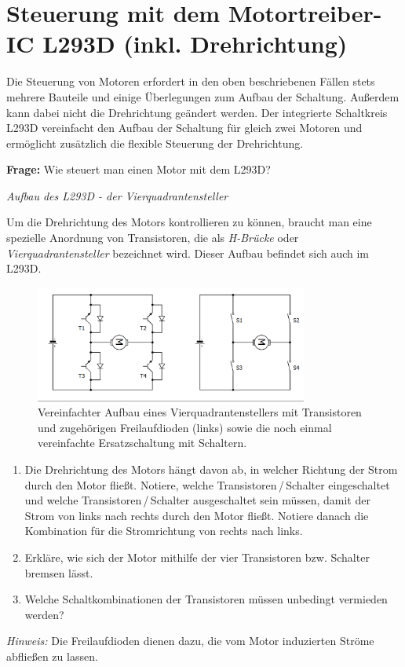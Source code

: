 \newpage
\section{Steuerung mit dem Motortreiber-IC L293D (inkl. Drehrichtung)}

Die Steuerung von Motoren erfordert in den oben beschriebenen Fällen stets mehrere Bauteile und einige Überlegungen zum Aufbau der Schaltung. Außerdem kann dabei nicht die Drehrichtung geändert werden. Der integrierte Schaltkreis L293D vereinfacht den Aufbau der Schaltung für gleich zwei Motoren und ermöglicht zusätzlich die flexible Steuerung der Drehrichtung.

\begin{ziel}
	\textbf{Frage:} Wie steuert man einen Motor mit dem L293D? 
\end{ziel}

\begin{aufgabe} \emph{Aufbau des L293D - der Vierquadrantensteller}
	
	Um die Drehrichtung des Motors kontrollieren zu können, braucht man eine spezielle Anordnung von Transistoren, die als \emph{H-Brücke} oder \emph{Vierquadrantensteller} bezeichnet wird. Dieser Aufbau befindet sich auch im L293D.
	
	\begin{figure}[H]
		\centering
		\includegraphics[width=0.8\textwidth]{./Zeichnungen/vierquadrantensteller.png}
		\caption{Vereinfachter Aufbau eines Vierquadrantenstellers mit Transistoren und zugehörigen Freilaufdioden (links) sowie die noch einmal vereinfachte Ersatzschaltung mit Schaltern.}
	\end{figure}

	\begin{enumerate}[label=\alph*), itemsep=0mm, parsep=0mm]
		\item Die Drehrichtung des Motors hängt davon ab, in welcher Richtung der Strom durch den Motor fließt. Notiere, welche Transistoren\,/\,Schalter eingeschaltet und welche Transistoren\,/\,Schalter ausgeschaltet sein müssen, damit der Strom von links nach rechts durch den Motor fließt. Notiere danach die Kombination für die Stromrichtung von rechts nach links.
		\item Erkläre, wie sich der Motor mithilfe der vier Transistoren bzw. Schalter bremsen lässt.
		\item Welche Schaltkombinationen der Transistoren müssen unbedingt vermieden werden?
	\end{enumerate}

	\emph{Hinweis:} Die Freilaufdioden dienen dazu, die vom Motor induzierten Ströme abfließen zu lassen.
\end{aufgabe}

